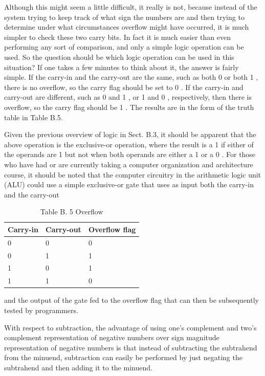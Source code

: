 \documentclass[10pt]{article}
\begin{document}
Although this might seem a little difficult, it really is not, because instead of the system trying to keep track of what sign the numbers are and then trying to determine under what circumstances overflow might have occurred, it is much simpler to check these two carry bits. In fact it is much easier than even performing any sort of comparison, and only a simple logic operation can be used. So the question should be which logic operation can be used in this situation? If one takes a few minutes to think about it, the answer is fairly simple. If the carry-in and the carry-out are the same, such as both 0 or both 1 , there is no overflow, so the carry flag should be set to 0 . If the carry-in and carry-out are different, such as 0 and 1 , or 1 and 0 , respectively, then there is overflow, so the carry flag should be 1 . The results are in the form of the truth table in Table B.5.

Given the previous overview of logic in Sect. B.3, it should be apparent that the above operation is the exclusive-or operation, where the result is a 1 if either of the operands are 1 but not when both operands are either a 1 or a 0 . For those who have had or are currently taking a computer organization and architecture course, it should be noted that the computer circuitry in the arithmetic logic unit (ALU) could use a simple exclusive-or gate that uses as input both the carry-in and the carry-out

\begin{table}[h]
\begin{center}
\captionsetup{labelformat=empty}
\caption{Table B. 5 Overflow}
\begin{tabular}{|l|l|l|}
\hline
Carry-in & Carry-out & Overflow flag \\
\hline
0 & 0 & 0 \\
\hline
0 & 1 & 1 \\
\hline
1 & 0 & 1 \\
\hline
1 & 1 & 0 \\
\hline
\end{tabular}
\end{center}
\end{table}

and the output of the gate fed to the overflow flag that can then be subsequently tested by programmers.

With respect to subtraction, the advantage of using one's complement and two's complement representation of negative numbers over sign magnitude representation of negative numbers is that instead of subtracting the subtrahend from the minuend, subtraction can easily be performed by just negating the subtrahend and then adding it to the minuend.
\end{document}
